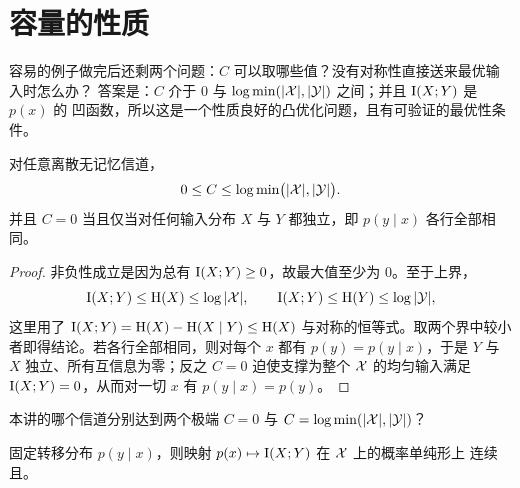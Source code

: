 \section{容量的性质}\label{sec:properties}
\quad{}

\begin{strand}
容易的例子做完后还剩两个问题：$C$ 可以取哪些值？没有对称性直接送来最优输入时怎么办？
答案是：$C$ 介于 $0$ 与 $\log\min(|\mathcal{X}|,|\mathcal{Y}|)$ 之间；并且 $\mathrm{I}(X;Y)$ 是 $p(x)$ 的
凹函数，所以这是一个性质良好的凸优化问题，且有可验证的最优性条件。
\end{strand}



\begin{proposition}[初等界]\label{prop:capacity-bounds}
对任意离散无记忆信道，
\[
  0\le C\le\log\min\bigl(|\mathcal{X}|,|\mathcal{Y}|\bigr).
\]
并且 $C=0$ 当且仅当对任何输入分布 $X$ 与 $Y$ 都独立，即 $p(y\mid x)$ 各行全部相同。
\end{proposition}

\begin{proof}
非负性成立是因为总有 $\mathrm{I}(X;Y)\ge0$，故最大值至少为 $0$。至于上界，
\[
  \mathrm{I}(X;Y)\le\mathrm{H}(X)\le\log|\mathcal{X}|,
  \qquad
  \mathrm{I}(X;Y)\le\mathrm{H}(Y)\le\log|\mathcal{Y}|,
\]
这里用了 $\mathrm{I}(X;Y)=\mathrm{H}(X)-\mathrm{H}(X\mid Y)\le\mathrm{H}(X)$ 与对称的恒等式。取两个界中较小
者即得结论。若各行全部相同，则对每个 $x$ 都有 $p(y)=p(y\mid x)$，于是 $Y$ 与 $X$
独立、所有互信息为零；反之 $C=0$ 迫使支撑为整个 $\mathcal{X}$ 的均匀输入满足
$\mathrm{I}(X;Y)=0$，从而对一切 $x$ 有 $p(y\mid x)=p(y)$。
\end{proof}

\begin{yourturn}
本讲的哪个信道分别达到两个极端 $C=0$ 与 $C=\log\min(|\mathcal{X}|,|\mathcal{Y}|)$？
\ifshowanswers\else\workspace[2]\fi
{}
\end{yourturn}


\begin{proposition}[关于输入的凹性]\label{prop:concavity}
固定转移分布 $p(y\mid x)$，则映射 $p(x)\mapsto\mathrm{I}(X;Y)$ 在 $\mathcal{X}$ 上的概率单纯形上
连续且。
\end{proposition}

